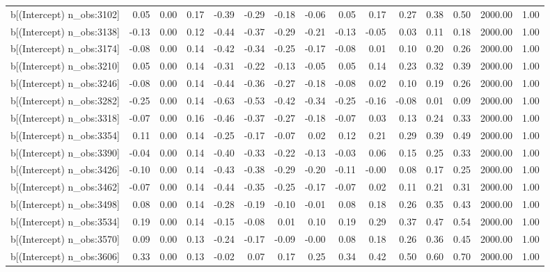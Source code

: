 \begin{table}[ht]
\begin{tabular}{rrrrrrrrrrrrrrr}
  b[(Intercept) n\_obs:3102] & 0.05 & 0.00 & 0.17 & -0.39 & -0.29 & -0.18 & -0.06 & 0.05 & 0.17 & 0.27 & 0.38 & 0.50 & 2000.00 & 1.00 \\ 
  b[(Intercept) n\_obs:3138] & -0.13 & 0.00 & 0.12 & -0.44 & -0.37 & -0.29 & -0.21 & -0.13 & -0.05 & 0.03 & 0.11 & 0.18 & 2000.00 & 1.00 \\ 
  b[(Intercept) n\_obs:3174] & -0.08 & 0.00 & 0.14 & -0.42 & -0.34 & -0.25 & -0.17 & -0.08 & 0.01 & 0.10 & 0.20 & 0.26 & 2000.00 & 1.00 \\ 
  b[(Intercept) n\_obs:3210] & 0.05 & 0.00 & 0.14 & -0.31 & -0.22 & -0.13 & -0.05 & 0.05 & 0.14 & 0.23 & 0.32 & 0.39 & 2000.00 & 1.00 \\ 
  b[(Intercept) n\_obs:3246] & -0.08 & 0.00 & 0.14 & -0.44 & -0.36 & -0.27 & -0.18 & -0.08 & 0.02 & 0.10 & 0.19 & 0.26 & 2000.00 & 1.00 \\ 
  b[(Intercept) n\_obs:3282] & -0.25 & 0.00 & 0.14 & -0.63 & -0.53 & -0.42 & -0.34 & -0.25 & -0.16 & -0.08 & 0.01 & 0.09 & 2000.00 & 1.00 \\ 
  b[(Intercept) n\_obs:3318] & -0.07 & 0.00 & 0.16 & -0.46 & -0.37 & -0.27 & -0.18 & -0.07 & 0.03 & 0.13 & 0.24 & 0.33 & 2000.00 & 1.00 \\ 
  b[(Intercept) n\_obs:3354] & 0.11 & 0.00 & 0.14 & -0.25 & -0.17 & -0.07 & 0.02 & 0.12 & 0.21 & 0.29 & 0.39 & 0.49 & 2000.00 & 1.00 \\ 
  b[(Intercept) n\_obs:3390] & -0.04 & 0.00 & 0.14 & -0.40 & -0.33 & -0.22 & -0.13 & -0.03 & 0.06 & 0.15 & 0.25 & 0.33 & 2000.00 & 1.00 \\ 
  b[(Intercept) n\_obs:3426] & -0.10 & 0.00 & 0.14 & -0.43 & -0.38 & -0.29 & -0.20 & -0.11 & -0.00 & 0.08 & 0.17 & 0.25 & 2000.00 & 1.00 \\ 
  b[(Intercept) n\_obs:3462] & -0.07 & 0.00 & 0.14 & -0.44 & -0.35 & -0.25 & -0.17 & -0.07 & 0.02 & 0.11 & 0.21 & 0.31 & 2000.00 & 1.00 \\ 
  b[(Intercept) n\_obs:3498] & 0.08 & 0.00 & 0.14 & -0.28 & -0.19 & -0.10 & -0.01 & 0.08 & 0.18 & 0.26 & 0.35 & 0.43 & 2000.00 & 1.00 \\ 
  b[(Intercept) n\_obs:3534] & 0.19 & 0.00 & 0.14 & -0.15 & -0.08 & 0.01 & 0.10 & 0.19 & 0.29 & 0.37 & 0.47 & 0.54 & 2000.00 & 1.00 \\ 
  b[(Intercept) n\_obs:3570] & 0.09 & 0.00 & 0.13 & -0.24 & -0.17 & -0.09 & -0.00 & 0.08 & 0.18 & 0.26 & 0.36 & 0.45 & 2000.00 & 1.00 \\ 
  b[(Intercept) n\_obs:3606] & 0.33 & 0.00 & 0.13 & -0.02 & 0.07 & 0.17 & 0.25 & 0.34 & 0.42 & 0.50 & 0.60 & 0.70 & 2000.00 & 1.00 \\ 

\end{tabular}
\end{table}
